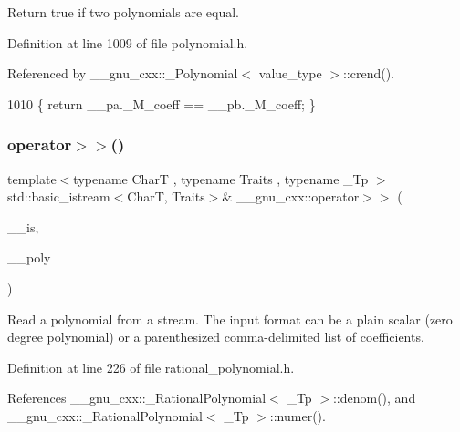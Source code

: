 Return true if two polynomials are equal. 

Definition at line 1009 of file polynomial.\+h.



Referenced by \+\_\+\+\_\+gnu\+\_\+cxx\+::\+\_\+\+Polynomial$<$ value\+\_\+type $>$\+::crend().


\begin{DoxyCode}
1010     \{ \textcolor{keywordflow}{return} \_\_pa.\_M\_coeff == \_\_pb.\_M\_coeff; \}
\end{DoxyCode}
\mbox{\label{namespace____gnu__cxx_a71511bc907f332ce9bb925c953f11714}} 
\subsubsection{\texorpdfstring{operator$>$$>$()}{operator>>()}\hspace{0.1cm}{\footnotesize\ttfamily [1/2]}}
{\footnotesize\ttfamily template$<$typename CharT , typename Traits , typename \+\_\+\+Tp $>$ \\
std\+::basic\+\_\+istream$<$CharT, Traits$>$\& \+\_\+\+\_\+gnu\+\_\+cxx\+::operator$>$$>$ (\begin{DoxyParamCaption}\item[{std\+::basic\+\_\+istream$<$ CharT, Traits $>$ \&}]{\+\_\+\+\_\+is,  }\item[{\hyperlink{class____gnu__cxx_1_1__RationalPolynomial}{\+\_\+\+Rational\+Polynomial}$<$ \+\_\+\+Tp $>$ \&}]{\+\_\+\+\_\+poly }\end{DoxyParamCaption})}

Read a polynomial from a stream. The input format can be a plain scalar (zero degree polynomial) or a parenthesized comma-\/delimited list of coefficients. 

Definition at line 226 of file rational\+\_\+polynomial.\+h.



References \+\_\+\+\_\+gnu\+\_\+cxx\+::\+\_\+\+Rational\+Polynomial$<$ \+\_\+\+Tp $>$\+::denom(), and \+\_\+\+\_\+gnu\+\_\+cxx\+::\+\_\+\+Rational\+Polynomial$<$ \+\_\+\+Tp $>$\+::numer().


